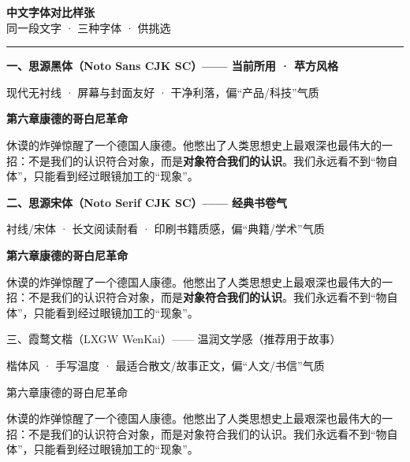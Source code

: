 \documentclass[12pt,a4paper,fontset=none]{ctexart}
\newcommand{\sep}{\par\vspace{4pt}{\color{rule}\rule{\linewidth}{0.6pt}}\par\vspace{10pt}}
\begin{document}
\thispagestyle{empty}

\begin{center}
{\heiB\bfseries\Large\color{ink} 中文字体对比样张}\\[2pt]
{\heiR\small\color{gray} 同一段文字 · 三种字体 · 供挑选}
\end{center}
\vspace{6pt}
{\color{rule}\rule{\linewidth}{1pt}}
\vspace{14pt}

{\heiR
{\heiB\bfseries\large\color{accent} 一、思源黑体（Noto Sans CJK SC）—— 当前所用 · 苹方风格}\par
\vspace{4pt}
{\small\color{gray} 现代无衬线 · 屏幕与封面友好 · 干净利落，偏“产品/科技”气质}\par
\vspace{6pt}
{\heiB\bfseries\large 第六章\quad 康德的哥白尼革命}\par
休谟的炸弹惊醒了一个德国人康德。他憋出了人类思想史上最艰深也最伟大的一招：不是我们的认识符合对象，而是\textbf{对象符合我们的认识}。我们永远看不到“物自体”，只能看到经过眼镜加工的“现象”。
}
\sep

{\songR
{\songB\bfseries\large\color{accent} 二、思源宋体（Noto Serif CJK SC）—— 经典书卷气}\par
\vspace{4pt}
{\heiR\small\color{gray} 衬线/宋体 · 长文阅读耐看 · 印刷书籍质感，偏“典籍/学术”气质}\par
\vspace{6pt}
{\songB\bfseries\large 第六章\quad 康德的哥白尼革命}\par
休谟的炸弹惊醒了一个德国人康德。他憋出了人类思想史上最艰深也最伟大的一招：不是我们的认识符合对象，而是\textbf{对象符合我们的认识}。我们永远看不到“物自体”，只能看到经过眼镜加工的“现象”。
}
\sep

{\kaiR
{\kaiM\large\color{accent} 三、霞鹜文楷（LXGW WenKai）—— 温润文学感（推荐用于故事）}\par
\vspace{4pt}
{\heiR\small\color{gray} 楷体风 · 手写温度 · 最适合散文/故事正文，偏“人文/书信”气质}\par
\vspace{6pt}
{\kaiM\large 第六章\quad 康德的哥白尼革命}\par
休谟的炸弹惊醒了一个德国人康德。他憋出了人类思想史上最艰深也最伟大的一招：不是我们的认识符合对象，而是{\kaiM 对象符合我们的认识}。我们永远看不到“物自体”，只能看到经过眼镜加工的“现象”。
}
\sep
\end{document}
